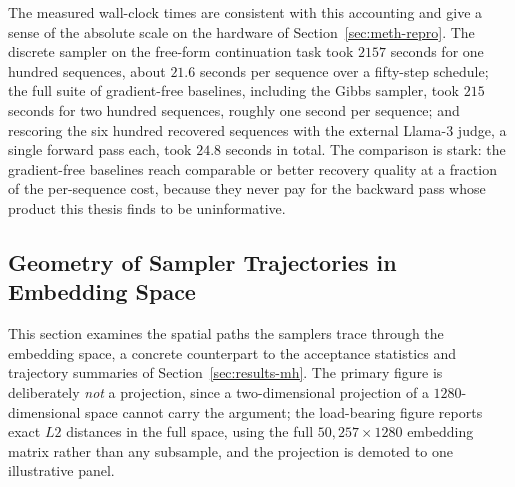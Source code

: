 The measured wall-clock times are consistent with this accounting and give a sense of the absolute scale on the hardware of Section~\ref{sec:meth-repro}. The discrete sampler on the free-form continuation task took $2157$ seconds for one hundred sequences, about $21.6$ seconds per sequence over a fifty-step schedule; the full suite of gradient-free baselines, including the Gibbs sampler, took $215$ seconds for two hundred sequences, roughly one second per sequence; and rescoring the six hundred recovered sequences with the external Llama-3 judge, a single forward pass each, took $24.8$ seconds in total.
The comparison is stark: the gradient-free baselines reach comparable or better recovery quality at a fraction of the per-sequence cost, because they never pay for the backward pass whose product this thesis finds to be uninformative.

\subsection{Geometry of Sampler Trajectories in Embedding Space}
\label{app:trajectory}

This section examines the spatial paths the samplers trace through the embedding space, a concrete counterpart to the acceptance statistics and trajectory summaries of Section~\ref{sec:results-mh}. The primary figure is deliberately \emph{not} a projection, since a two-dimensional projection of a $1280$-dimensional space cannot carry the argument; the load-bearing figure reports exact $L2$ distances in the full space, using the full $50{,}257\times 1280$ embedding matrix rather than any subsample, and the projection is demoted to one illustrative panel.

